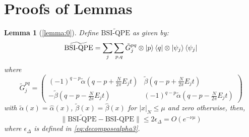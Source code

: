 \documentclass[aps,floatfix,10pt,amssymb,amsfont,amsmath,superscriptaddress,float,nofootinbib,longbibliography,nobalancelastpage,twocolumn]{revtex4-2}
\newtheorem*{lemma*}{Lemma}
\begin{document}
\section{Proofs of Lemmas}
\label{section:appendixTrunc}
\begin{lemma*}[\ref{lemma:0}]
    Define $\widetilde{\text{BSI-QPE}}$ as given by:
    \begin{equation}
       \widetilde{\text{BSI-QPE}}=\sum_j \sum_{p,q} \tilde G^{pq}_j \otimes \ket{p}\bra{q} \otimes \ket{\psi_j}\bra{\psi_j}
    \end{equation}
    where 
    \begin{equation}
        \tilde G^{pq}_j = \begin{pmatrix}
        (-1)^{q-p}\tilde\alpha(q-p+\frac{N}{2\pi}E_jt) & \tilde\beta(q-p+\frac{N}{2\pi}E_jt)\\
        -\tilde\beta (q-p-\frac{N}{2\pi}E_jt) & (-1)^{q-p}\tilde\alpha(q-p-\frac{N}{2\pi}E_jt)
    \end{pmatrix}
    \end{equation}
    with $\tilde\alpha(x)=\hat\alpha(x)$, $\tilde\beta(x)=\hat\beta(x)$ for $|x|_{N}\leq\mu$ and zero otherwise, then,  
    \begin{equation}
        \|\widetilde{\text{BSI-QPE}}-\text{BSI-QPE}\| \leq 2\epsilon_{\Delta}= O\left(e^{-\nu \mu}\right)
    \end{equation}
    where $\epsilon_{\Delta}$ is defined in \eqref{eq:decomposealpha3}.
\end{lemma*}
\end{document}
